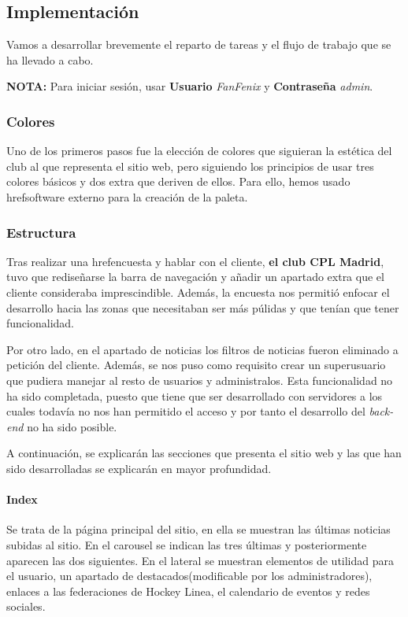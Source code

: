 \documentclass[10pt, spanish, pdftex]{template/UC3M_document}
\begin{document}
\subsection{Implementación}
Vamos a desarrollar brevemente el reparto de tareas y el flujo de trabajo que se ha llevado a cabo.

\textbf{NOTA:} Para iniciar sesión, usar \textbf{Usuario} \textit{FanFenix} y \textbf{Contraseña} \textit{admin}.

\subsubsection{Colores}\label{paleta}
Uno de los primeros pasos fue la elección de colores que siguieran la estética del club al que representa el sitio web, pero siguiendo los principios de usar tres colores básicos y dos extra que deriven de ellos. Para ello, hemos usado href{}{software externo} para la creación de la paleta.

\subsubsection{Estructura}
Tras realizar una href{}{encuesta} y hablar con el cliente, \textbf{el club CPL Madrid}, tuvo que rediseñarse la barra de navegación y añadir un apartado extra que el cliente consideraba imprescindible. Además, la encuesta nos permitió enfocar el desarrollo hacia las zonas que necesitaban ser más púlidas y que tenían que tener funcionalidad.

Por otro lado, en el apartado de noticias los filtros de noticias fueron eliminado a petición del cliente. Además, se nos puso como requisito crear un superusuario que pudiera manejar al resto de usuarios y administralos. Esta funcionalidad no ha sido completada, puesto que tiene que ser desarrollado con servidores a los cuales todavía no nos han permitido el acceso y por tanto el desarrollo del \textit{back-end} no ha sido posible.

A continuación, se explicarán las secciones que presenta el sitio web y las que han sido desarrolladas se explicarán en mayor profundidad.

\paragraph{Index}
Se trata de la página principal del sitio, en ella se muestran las últimas noticias subidas al sitio. En el carousel se indican las tres últimas y posteriormente aparecen las dos siguientes.
En el lateral se muestran elementos de utilidad para el usuario, un apartado de destacados(modificable por los administradores), enlaces a las federaciones de Hockey Linea, el calendario de eventos y redes sociales.
\end{document}
